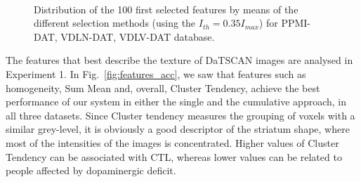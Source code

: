\begin{figure}
	\centering
	\\
	
	\caption{Distribution of the 100 first selected features by means of the different selection methods (using the $I_{th} = 0.35 I_{max}$) for PPMI-DAT, VDLN-DAT, VDLV-DAT database.} 
	\label{fig:fnumber}
\end{figure}

The features that best describe the texture of DaTSCAN images are analysed in Experiment 1. In Fig.~\ref{fig:features_acc}, we saw that features such as homogeneity, Sum Mean and, overall, Cluster Tendency, achieve the best performance of our system in either the single and the cumulative approach, in all three datasets. Since Cluster tendency measures the grouping of voxels with a similar grey-level, it is obviously a good descriptor of the striatum shape, where most of the intensities of the images is concentrated. Higher values of Cluster Tendency can be associated with \ac{CTL}, whereas lower values can be related to people affected by dopaminergic deficit. 

